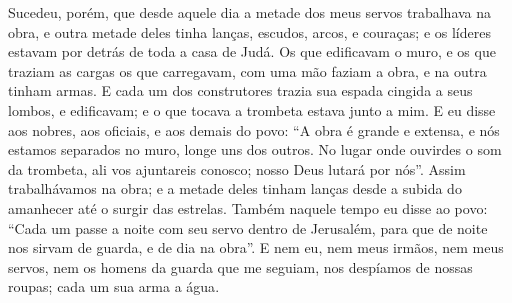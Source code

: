 {{  Sucedeu, porém, que desde aquele dia a metade dos meus servos trabalhava na obra, e outra metade deles tinha lanças, escudos, arcos, e couraças; e os líderes estavam por detrás de toda a casa de Judá.
  Os que edificavam o muro, e os que traziam as cargas {} os que carregavam, com uma mão faziam a obra, e na outra tinham armas.
  E cada um dos construtores trazia sua espada cingida a seus lombos, e {} edificavam; e o que tocava a trombeta estava junto a mim.
  E eu disse aos nobres, aos oficiais, e aos demais do povo: \enquote{A obra é grande e extensa, e nós estamos separados no muro, longe uns dos outros.
  No lugar onde ouvirdes o som da trombeta, ali vos ajuntareis conosco; nosso Deus lutará por nós}.
  Assim trabalhávamos na obra; e a metade deles tinham lanças desde a subida do amanhecer até o surgir das estrelas.
  Também naquele tempo eu disse ao povo: \enquote{Cada um passe a noite com seu servo dentro de Jerusalém, para que de noite nos sirvam de guarda, e de dia na obra}.
  E nem eu, nem meus irmãos, nem meus servos, nem os homens da guarda que me seguiam, nos despíamos de nossas roupas; cada um {} sua arma {} a água}.
\par }

